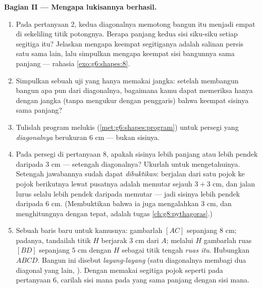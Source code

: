 \begin{problem}
\medskip
\noindent\textbf{Bagian II --- Mengapa lukisannya berhasil.}
\begin{enumerate}[resume]
  \item Pada pertanyaan 2, kedua diagonalnya memotong bangun itu
        menjadi empat  di sekeliling titik
        potongnya. Berapa panjang kedua sisi siku-siku setiap
        segitiga itu? Jelaskan mengapa keempat segitiganya adalah
        salinan persis satu sama lain, lalu simpulkan mengapa keempat
        sisi bangunnya sama panjang --- rahasia \cref{exo:g6:shapes:8}.
  \item Simpulkan sebuah uji yang hanya memakai jangka: setelah
        membangun bangun apa pun dari diagonalnya, bagaimana kamu
        dapat memeriksa hanya dengan jangka (tanpa mengukur dengan
        penggaris) bahwa keempat sisinya sama panjang?
  \item Tulislah program melukis
        (\cref{met:g6:shapes:program}) untuk persegi yang
        \emph{diagonalnya} berukuran $6$ cm --- bukan sisinya.
  \item Pada persegi di pertanyaan 8, apakah sisinya lebih panjang
        atau lebih pendek daripada $3$ cm --- setengah diagonalnya?
        Ukurlah untuk mengetahuinya. Setengah jawabannya sudah dapat
        \emph{dibuktikan}: berjalan dari satu pojok ke pojok
        berikutnya lewat pusatnya adalah memutar sejauh $3 + 3$ cm,
        dan jalan lurus selalu lebih pendek daripada memutar --- jadi
        sisinya lebih pendek daripada $6$ cm. (Membuktikan bahwa ia
        juga mengalahkan $3$ cm, dan menghitungnya dengan tepat,
        adalah tugas \cref{ch:g8:pythagoras}.)
  \item Sebuah baris baru untuk kamusnya: gambarlah  $[AC]$
        sepanjang $8$ cm; padanya, tandailah titik $H$ berjarak $3$ cm
        dari $A$; melalui $H$ gambarlah ruas  $[BD]$
        sepanjang $5$ cm dengan $H$ sebagai titik tengah \emph{ruas
        itu}. Hubungkan $ABCD$. Bangun ini disebut
        \emph{layang-layang} (satu diagonalnya
        membagi dua diagonal yang lain, ). Dengan memakai
        segitiga pojok seperti pada pertanyaan 6, carilah sisi mana
        pada  yang sama panjang dengan sisi mana.
\end{enumerate}


\end{problem}
